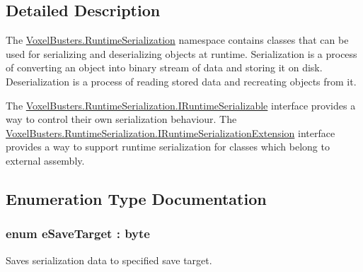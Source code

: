 \subsection{Detailed Description}
The \hyperlink{namespace_voxel_busters_1_1_runtime_serialization}{Voxel\+Busters.\+Runtime\+Serialization} namespace contains classes that can be used for serializing and deserializing objects at runtime. Serialization is a process of converting an object into binary stream of data and storing it on disk. Deserialization is a process of reading stored data and recreating objects from it. 

The \hyperlink{interface_voxel_busters_1_1_runtime_serialization_1_1_i_runtime_serializable}{Voxel\+Busters.\+Runtime\+Serialization.\+I\+Runtime\+Serializable} interface provides a way to control their own serialization behaviour. The \hyperlink{interface_voxel_busters_1_1_runtime_serialization_1_1_i_runtime_serialization_extension}{Voxel\+Busters.\+Runtime\+Serialization.\+I\+Runtime\+Serialization\+Extension} interface provides a way to support runtime serialization for classes which belong to external assembly. 

\subsection{Enumeration Type Documentation}
\hypertarget{namespace_voxel_busters_1_1_runtime_serialization_aacaa3008b2cb441fbe4708df854019bf}{}
\subsubsection[{e\+Save\+Target}]{\setlength{\rightskip}{0pt plus 5cm}enum {\bf e\+Save\+Target} \+: byte}\label{namespace_voxel_busters_1_1_runtime_serialization_aacaa3008b2cb441fbe4708df854019bf}


Saves serialization data to specified save target. 

